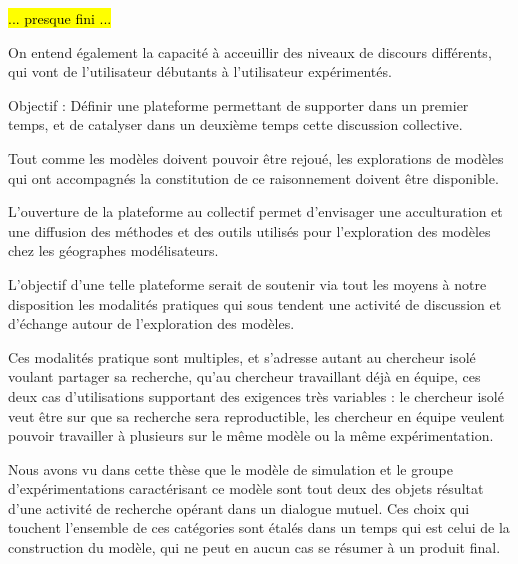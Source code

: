 \hl{... presque fini ...}





On entend également la capacité à acceuillir des niveaux de discours différents, qui vont de l'utilisateur débutants à l'utilisateur expérimentés.

Objectif : Définir une plateforme permettant de supporter dans un premier temps, et de catalyser dans un deuxième temps cette discussion collective.




Tout comme les modèles doivent pouvoir être rejoué, les explorations de modèles qui ont accompagnés la constitution de ce raisonnement doivent être disponible.

L'ouverture de la plateforme au collectif permet d'envisager une acculturation et une diffusion des méthodes et des outils utilisés pour l'exploration des modèles chez les géographes modélisateurs. 

L'objectif d'une telle plateforme serait de soutenir via tout les moyens à notre disposition les modalités pratiques qui sous tendent une activité de discussion et d'échange autour de l'exploration des modèles.

Ces modalités pratique sont multiples, et s'adresse autant au chercheur isolé voulant partager sa recherche, qu'au chercheur travaillant déjà en équipe, ces deux cas d'utilisations supportant des exigences très variables : le chercheur isolé veut être sur que sa recherche sera reproductible, les chercheur en équipe veulent pouvoir travailler à plusieurs sur le même modèle ou la même expérimentation. 


Nous avons vu dans cette thèse que le modèle de simulation et le groupe d'expérimentations caractérisant ce modèle sont tout deux des objets résultat d'une activité de recherche opérant dans un dialogue mutuel. Ces choix qui touchent l'ensemble de ces catégories sont étalés dans un temps qui est celui de la construction du modèle, qui ne peut en aucun cas se résumer à un produit final. 




